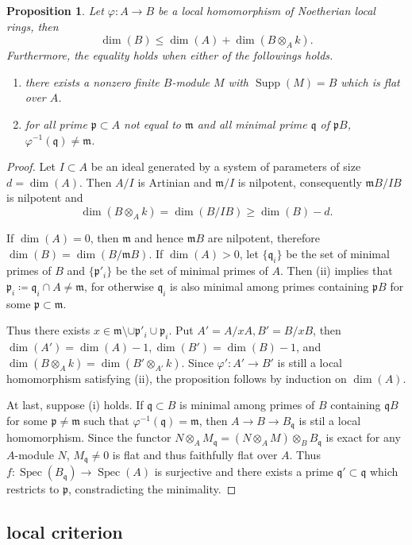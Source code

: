 \documentclass[leqno]{amsart}
\DeclareMathOperator{\Supp}{Supp}
\DeclareMathOperator{\Spec}{Spec}
\newcommand{\1}{\mathbf{1}}
\newcommand{\fm}{\mathfrak m}
\newcommand{\fp}{\mathfrak p}
\newcommand{\fq}{\mathfrak q}
\newtheorem{prop}[thm]{Proposition}
\theoremstyle{definition}
\theoremstyle{remark}
\begin{document}
\begin{prop}
    Let $\varphi\colon A\to B$ be a local homomorphism
    of Noetherian local rings, then
    \[
        \dim(B)\leq \dim(A)+\dim(B\otimes_Ak).
    \]
    Furthermore, the equality holds 
    when either of the followings holds.
    \begin{enumerate}[label=(\roman*)]
        \item there exists a nonzero finite $B$-module $M$ 
	with $\Supp(M)=B$ which is flat over $A$.
        \item for all prime $\fp\subset A$ not equal to $\fm$ 
	and all minimal prime $\fq$ of $\fp B$, 
	$\varphi^{-1}(\fq)\neq \fm$.
    \end{enumerate}
\end{prop}
\begin{proof}
	Let $I\subset A$ be an ideal generated
	by a system of parameters of size  $d=\dim(A)$.
	Then $A/I$ is Artinian and $\fm/I$ is nilpotent,
	consequently $\fm B/IB$ is nilpotent and 
	\[
		\dim(B\otimes_Ak)=\dim(B/IB)\geq \dim(B)-d.
	\]
	
	If $\dim(A)=0$, then  $\fm$ and hence $\fm B$
	are nilpotent, therefore $\dim(B)=\dim(B/\fm B)$.
	If $\dim(A)>0$,
	let  $\{\fq_i\}$ be the set of minimal primes of $B$ and
	$\{\fp'_i\}$ be the set of minimal primes of $A$.
	Then (ii) implies that
	$\fp_i\coloneqq \fq_i\cap A\neq \fm$,
	for otherwise $\fq_i$ is also minimal 
	among primes containing  $\fp B$ for some $\fp\subset \fm$.

	Thus there exists $x\in \fm\setminus \cup\fp'_i\cup\fp_i$.
	Put $A'=A/xA, B'=B/xB$,
	then $\dim(A')=\dim(A)-1,\dim(B')=\dim(B)-1$,
	and $\dim(B\otimes_Ak)=\dim(B'\otimes_{A'}k)$.
	Since $\varphi'\colon A'\to B'$
	is still a local homomorphism satisfying (ii),
	the proposition follows by induction on  $\dim(A)$.

	At last, suppose (i) holds.
	If  $\fq\subset B$ is minimal among primes of $B$
	containing  $\fq B$ for some  $\fp\neq \fm$
	such that $\varphi^{-1}(\fq)=\fm$,
	then  $A\to B\to B_\fq$ is stil a local homomorphism.
	Since the functor 
	$N\otimes_AM_\fq=(N\otimes_AM)\otimes_BB_\fq$
	is exact for any  $A$-module $N$,
	$M_\fq\neq 0$ is flat and thus faithfully flat over $A$.
	Thus $f\colon \Spec(B_\fq)\to \Spec(A)$
	is surjective and there exists a prime $\fq'\subset \fq$ 
	which restricts to $\fp$, constradicting the minimality.
\end{proof}

\subsection{local criterion}
\end{document}
